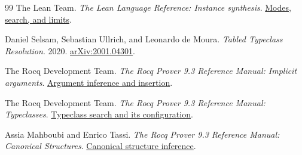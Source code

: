 \documentclass[10pt,a4paper]{article}
\begin{document}
\begin{thebibliography}{99}
The Lean Team.
\emph{The Lean Language Reference: Instance synthesis}.
\href{https://lean-lang.org/doc/reference/latest/Type-Classes/Instance-Synthesis/}{Modes, search, and limits}.

Daniel Selsam, Sebastian Ullrich, and Leonardo de Moura.
\emph{Tabled Typeclass Resolution}. 2020.
\href{https://arxiv.org/abs/2001.04301}{arXiv:2001.04301}.

The Rocq Development Team.
\emph{The Rocq Prover 9.3 Reference Manual: Implicit arguments}.
\href{https://rocq-prover.org/doc/V9.3.0/refman/language/extensions/implicit-arguments.html}
 {Argument inference and insertion}.

The Rocq Development Team.
\emph{The Rocq Prover 9.3 Reference Manual: Typeclasses}.
\href{https://rocq-prover.org/doc/V9.3.0/refman/addendum/type-classes.html}{Typeclass search and its configuration}.

Assia Mahboubi and Enrico Tassi.
\emph{The Rocq Prover 9.3 Reference Manual: Canonical Structures}.
\href{https://rocq-prover.org/doc/V9.3.0/refman/language/extensions/canonical.html}{Canonical structure inference}.

\end{thebibliography}
\end{document}
